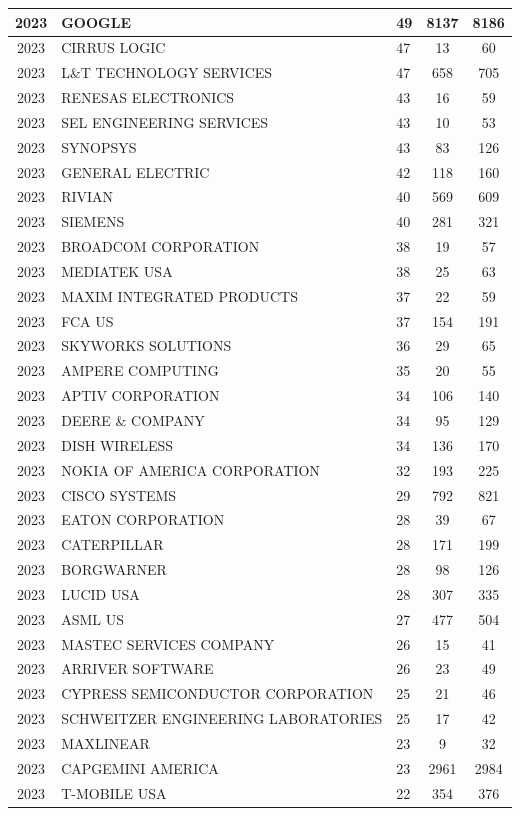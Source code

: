 \documentclass{article}%
\begin{document}
\begin{longtable}{c|p{20em}|p{5em}|c|c}
\hline%
2023&GOOGLE&49&8137&8186\\%
\hline%
2023&CIRRUS LOGIC&47&13&60\\%
\hline%
2023&L\&T TECHNOLOGY SERVICES&47&658&705\\%
\hline%
2023&RENESAS ELECTRONICS&43&16&59\\%
\hline%
2023&SEL ENGINEERING SERVICES&43&10&53\\%
\hline%
2023&SYNOPSYS&43&83&126\\%
\hline%
2023&GENERAL ELECTRIC&42&118&160\\%
\hline%
2023&RIVIAN&40&569&609\\%
\hline%
2023&SIEMENS&40&281&321\\%
\hline%
2023&BROADCOM CORPORATION&38&19&57\\%
\hline%
2023&MEDIATEK USA&38&25&63\\%
\hline%
2023&MAXIM INTEGRATED PRODUCTS&37&22&59\\%
\hline%
2023&FCA US&37&154&191\\%
\hline%
2023&SKYWORKS SOLUTIONS&36&29&65\\%
\hline%
2023&AMPERE COMPUTING&35&20&55\\%
\hline%
2023&APTIV CORPORATION&34&106&140\\%
\hline%
2023&DEERE \& COMPANY&34&95&129\\%
\hline%
2023&DISH WIRELESS&34&136&170\\%
\hline%
2023&NOKIA OF AMERICA CORPORATION&32&193&225\\%
\hline%
2023&CISCO SYSTEMS&29&792&821\\%
\hline%
2023&EATON CORPORATION&28&39&67\\%
\hline%
2023&CATERPILLAR&28&171&199\\%
\hline%
2023&BORGWARNER&28&98&126\\%
\hline%
2023&LUCID USA&28&307&335\\%
\hline%
2023&ASML US&27&477&504\\%
\hline%
2023&MASTEC SERVICES COMPANY&26&15&41\\%
\hline%
2023&ARRIVER SOFTWARE&26&23&49\\%
\hline%
2023&CYPRESS SEMICONDUCTOR CORPORATION&25&21&46\\%
\hline%
2023&SCHWEITZER ENGINEERING LABORATORIES&25&17&42\\%
\hline%
2023&MAXLINEAR&23&9&32\\%
\hline%
2023&CAPGEMINI AMERICA&23&2961&2984\\%
\hline%
2023&T{-}MOBILE USA&22&354&376\\%

\end{longtable}
\end{document}
